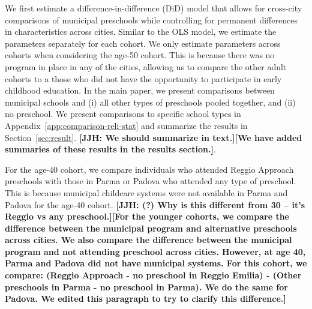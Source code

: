 We first estimate a difference-in-difference (DiD) model that allows for cross-city comparisons of municipal preschools while controlling for permanent differences in characteristics across cities. Similar to the OLS model, we estimate the parameters separately for each cohort. We only estimate parameters across cohorts when considering the age-50 cohort. This is because there was no program in place in any of the cities, allowing us to compare the other adult cohorts to a those who did not have the opportunity to participate in early childhood education. In the main paper, we present comparisons between municipal schools and (i) all other types of preschools pooled together, and (ii) no preschool. We present comparisons to specific school types in Appendix~\ref{app:comparison-reli-stat} and summarize the results in Section~\ref{sec:result}. \textbf{[JJH: We should summarize in text.][We have added summaries of these results in the results section.]}. 

For the age-40 cohort, we compare individuals who attended Reggio Approach preschools with those in Parma or Padova who attended any type of preschool. This is because municipal childcare systems were not available in Parma and Padova for the age-40 cohort. \textbf{[JJH: (?) Why is this different from 30 -- it's Reggio vs any preschool.][For the younger cohorts, we compare the difference between the municipal program and alternative preschools across cities. We also compare the difference between the municipal program and not attending preschool across cities. However, at age 40, Parma and Padova did not have municipal systems. For this cohort, we compare: (Reggio Approach - no preschool in Reggio Emilia) - (Other preschools in Parma - no preschool in Parma). We do the same for Padova. We edited this paragraph to try to clarify this difference.]}

